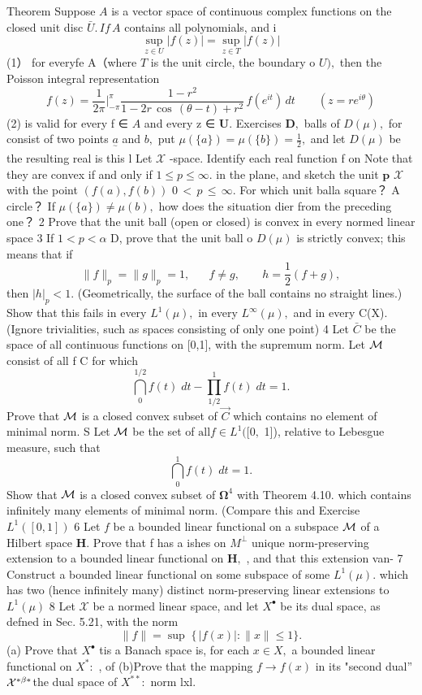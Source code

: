 Theorem Suppose $\scriptstyle A$ is a vector space of continuous complex functions on the closed unit disc ${\bar{U}}.\,I f\,A$ contains all polynomials, and i $$ \operatorname*{sup}_{z\in U}|f(z)|=\operatorname*{sup}_{z\in T}|f(z)| $$ (1） for everyfe A（where ${\mathbf{}}T$ is the unit circle, the boundary o $U),$ then the Poisson integral representation $$ f(z)={\frac{1}{2\pi}} |_{-\pi}^{\pi}{\frac{1-r^{2}}{1-2r\,\cos\,(\theta-t)+r^{2}}}\,f(e^{i t})\,d t\qquad(z=r e^{i\theta}) $$ (2) is valid for every f ∈ $\scriptstyle A$ and every z ∈ ${\boldsymbol{U}}.$ Exercises ${\boldsymbol{D}},$ balls of $D(\mu),$ for consist of two points $\underset{^{\sim}}{a}$ and $b,$ put $\mu(\{a\})=\mu(\{b\})={\frac{1}{2}},$ and let $D(\mu)$ be the resulting real is this l Let $\scriptstyle{\mathcal{X}}$ -space. Identify each real function f on Note that they are convex if and only if $1\leq p\leq\infty.$ in the plane, and sketch the unit ${\boldsymbol{p}}$ $\scriptstyle{\mathcal{X}}$ with the point $(f(a),f(b))$ $\scriptstyle0\,<\,p\,\leq\,\infty.$ For which unit balla square？ A circle？ If $\mu(\{a\})\neq\mu(b),$ how does the situation dier from the preceding one？ 2 Prove that the unit ball (open or closed) is convex in every normed linear space 3 If $1<p<\alpha$ D, prove that the unit ball o $D(\mu)$ is strictly convex; this means that if $$ \|f\|_{p}=\|g\|_{p}=1,\;\;\;\;\;\;f\neq g,\;\;\;\;\;\;\;h=\frac{1}{2}(f+g), $$ then $|h|_{p}<1.$ (Geometrically, the surface of the ball contains no straight lines.) Show that this fails in every $L^{1}(\mu),$ in every $L^{\infty}(\mu),$ and in every C(X).(Ignore trivialities, such as spaces consisting of only one point) 4 Let $\scriptstyle{\bar{C}}$ be the space of all continuous functions on [0,1], with the supremum norm. Let ${\cal{M}}$ consist of all f C for which $$ \bigcap_{0}^{1/2}f(t)\;d t-\prod_{1/2}^{1}f(t)\;d t=1. $$ Prove that ${\cal{M}}$ is a closed convex subset of $\scriptstyle{\vec{C}}$ which contains no element of minimal norm. S Let ${\cal{M}}$ be the set of ${\mathrm{all}}f\in L^{1}([0,$ 1]), relative to Lebesgue measure, such that $$ \bigcap_{0}^{1}f(t)\;d t=1. $$ Show that ${\cal{M}}$ is a closed convex subset of $\mathbf{\Omega}^{4}$ with Theorem 4.10. which contains infinitely many elements of minimal norm. (Compare this and Exercise $L^{1}([0,1])$ 6 Let $\boldsymbol{\mathit{f}}$ be a bounded linear functional on a subspace ${\cal{M}}$ of a Hilbert space ${\boldsymbol{H}}.$ Prove that f has a ishes on $M^{\bot}$ unique norm-preserving extension to a bounded linear functional on ${\boldsymbol{H}},$ , and that this extension van- 7 Construct a bounded linear functional on some subspace of some $L^{1}(\mu).$ which has two (hence infinitely many) distinct norm-preserving linear extensions to $L^{1}(\mu)$ 8 Let $\scriptstyle{\mathcal{X}}$ be a normed linear space, and let $X^{\bullet}$ be its dual space, as defned in Sec. 5.21, with the norm $$ \|f\|=\operatorname*{sup}\;\{\,|f(x)|\!:\|x\|\leq1\}. $$ (a) Prove that $X^{\bullet}$ tis a Banach space is, for each $x\in X,$ a bounded linear functional on $X^{*}{\mathrm{:}}$ , of (b)Prove that the mapping $f\to f(x)$ in its "second dual” $\textstyle{\cal X}^{\ast\beta\ast}\!\!$ the dual space of $X^{**}{\mathrm{:}}$ norm lxl. 